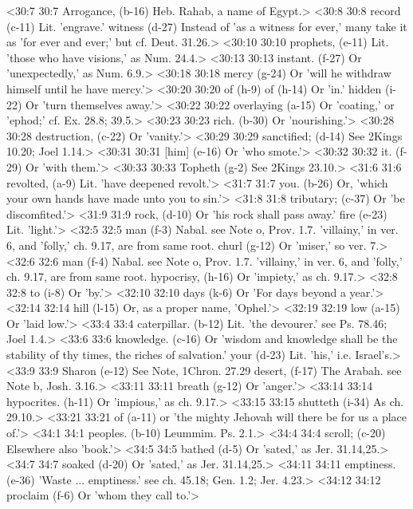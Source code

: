<30:7 30:7  Arrogance, (b-16)  Heb. Rahab, a name of Egypt.>
<30:8 30:8  record (c-11)  Lit. 'engrave.'
  witness (d-27)  Instead of 'as a witness for ever,' many take it as 'for ever  and ever;' but cf. Deut. 31.26.>
<30:10 30:10  prophets, (e-11)  Lit. 'those who have visions,' as Num. 24.4.>
<30:13 30:13  instant. (f-27)  Or 'unexpectedly,' as Num. 6.9.>
<30:18 30:18  mercy (g-24)  Or 'will he withdraw himself until he have mercy.'>
<30:20 30:20  of (h-9)  of (h-14)
  Or 'in.'
  hidden (i-22)  Or 'turn themselves away.'>
<30:22 30:22  overlaying (a-15)  Or 'coating,' or 'ephod;' cf. Ex. 28.8; 39.5.>
<30:23 30:23  rich. (b-30)  Or 'nourishing.'>
<30:28 30:28  destruction, (c-22)  Or 'vanity.'>
<30:29 30:29  sanctified; (d-14)  See 2Kings 10.20; Joel 1.14.>
<30:31 30:31  [him] (e-16)  Or 'who smote.'>
<30:32 30:32  it. (f-29)  Or 'with them.'>
<30:33 30:33  Topheth (g-2)  See 2Kings 23.10.>
<31:6 31:6  revolted, (a-9)  Lit. 'have deepened revolt.'>
<31:7 31:7  you. (b-26)  Or, 'which your own hands have made unto you to sin.'>
<31:8 31:8  tributary; (c-37)  Or 'be discomfited.'>
<31:9 31:9  rock, (d-10)  Or 'his rock shall pass away.'
  fire (e-23)  Lit. 'light.'>
<32:5 32:5  man (f-3)  Nabal. see Note o, Prov. 1.7. 'villainy,' in ver. 6, and  'folly,' ch. 9.17, are from same root.
  churl (g-12)  Or 'miser,' so ver. 7.>
<32:6 32:6  man (f-4)  Nabal. see Note o, Prov. 1.7. 'villainy,' in ver. 6, and  'folly,' ch. 9.17, are from same root.
  hypocrisy, (h-16)  Or 'impiety,' as ch. 9.17.>
<32:8 32:8  to (i-8)  Or 'by.'>
<32:10 32:10  days (k-6)  Or 'For days beyond a year.'>
<32:14 32:14  hill (l-15)  Or, as a proper name, 'Ophel.'>
<32:19 32:19  low (a-15)  Or 'laid low.'>
<33:4 33:4  caterpillar. (b-12)  Lit. 'the devourer.' see Ps. 78.46; Joel 1.4.>
<33:6 33:6  knowledge. (c-16)  Or 'wisdom and knowledge shall be the stability of thy times,  the riches of salvation.'
  your (d-23)  Lit. 'his,' i.e. Israel's.>
<33:9 33:9  Sharon (e-12)  See Note, 1Chron. 27.29
  desert, (f-17)  The Arabah. see Note b, Josh. 3.16.>
<33:11 33:11  breath (g-12)  Or 'anger.'>
<33:14 33:14  hypocrites. (h-11)  Or 'impious,' as ch. 9.17.>
<33:15 33:15  shutteth (i-34)  As ch. 29.10.>
<33:21 33:21  of (a-11)  or 'the mighty Jehovah will there be for us a place of.'>
<34:1 34:1  peoples. (b-10)  Leummim. Ps. 2.1.>
<34:4 34:4  scroll; (c-20)  Elsewhere also 'book.'>
<34:5 34:5  bathed (d-5) Or 'sated,' as Jer. 31.14,25.>
<34:7 34:7  soaked (d-20)  Or 'sated,' as Jer. 31.14,25.>
<34:11 34:11  emptiness. (e-36)  'Waste ... emptiness.' see ch. 45.18; Gen. 1.2; Jer. 4.23.>
<34:12 34:12  proclaim (f-6)  Or 'whom they call to.'>
